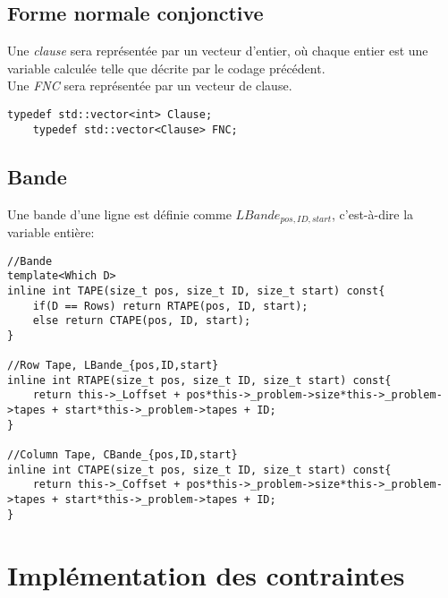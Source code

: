 \documentclass[a4paper,12pt]{report}
\begin{document}
\subsection{Forme normale conjonctive}
Une \textit{clause} sera représentée par un vecteur d'entier, où chaque entier est une variable calculée telle que décrite par le codage précédent.\\
Une \textit{FNC} sera représentée par un vecteur de clause.				
\lstset{style=Cpp, caption=clause et FNC, label=C:FNC_Clause}
\begin{lstlisting}[mathescape=true]	
	typedef std::vector<int> Clause;
	typedef std::vector<Clause> FNC;
\end{lstlisting}

\subsection{Bande}
Une bande d'une ligne est définie comme $LBande_{pos,ID,start}$, c'est-à-dire la variable entière:
\lstset{style=Cpp, caption=Une bande comme variable, label=C:bande}
\begin{lstlisting}[mathescape=true]
//Bande
template<Which D>
inline int TAPE(size_t pos, size_t ID, size_t start) const{
	if(D == Rows) return RTAPE(pos, ID, start);
	else return CTAPE(pos, ID, start);
}

//Row Tape, LBande_{pos,ID,start}
inline int RTAPE(size_t pos, size_t ID, size_t start) const{
	return this->_Loffset + pos*this->_problem->size*this->_problem->tapes + start*this->_problem->tapes + ID;
}

//Column Tape, CBande_{pos,ID,start}
inline int CTAPE(size_t pos, size_t ID, size_t start) const{
	return this->_Coffset + pos*this->_problem->size*this->_problem->tapes + start*this->_problem->tapes + ID;
}
\end{lstlisting}

\section{Implémentation des contraintes}
\end{document}
